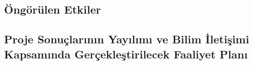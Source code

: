\documentclass[a4paper]{article}
\begin{document}
\subsection{Öngörülen Etkiler}
\setlength{\parindent}{15pt}            



\begin{framed}
\lipsum[1-3]
\end{framed}


\subsection{Proje Sonuçlarının Yayılımı ve Bilim İletişimi Kapsamında Gerçekleştirilecek Faaliyet Planı}
\end{document}
